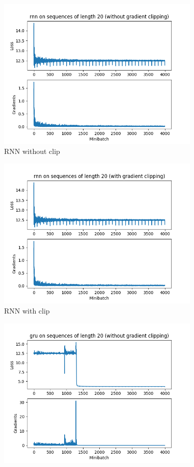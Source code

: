 \documentclass[11pt, oneside]{article}      %
\begin{document}
\begin{enumerate}   [(a)]
\begin{figure}[htbp] %
   \centering
\begin{minipage}{0.5\linewidth}\centering
   \includegraphics[width=3.8in]{q3-noclip-rnn.png} 
   \\{\footnotesize  RNN without clip  }
\end{minipage}
\begin{minipage}{0.49\linewidth}\centering
   \includegraphics[width=3.8in]{q3-clip-rnn.png} 
   \\{\footnotesize  RNN with clip  }
\end{minipage}
\begin{minipage}{0.5\linewidth}\centering
   \includegraphics[width=3.8in]{q3-noclip-gru.png} 

\end{minipage}
\end{figure}
\end{enumerate}
\end{document}
